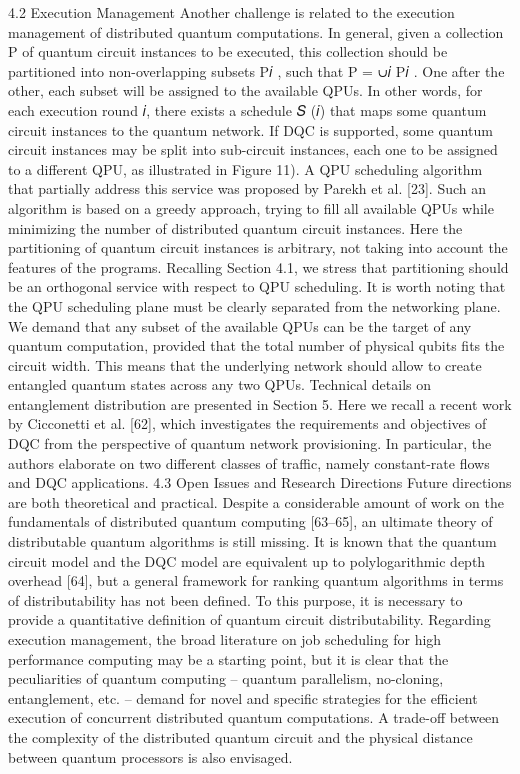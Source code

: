4.2 Execution Management Another challenge is related to the execution management of distributed quantum computations. In general, given a collection P of quantum circuit instances to be executed, this collection should be partitioned into non-overlapping subsets P𝑖 , such that P = ∪𝑖 P𝑖 . One after the other, each subset will be assigned to the available QPUs. In other words, for each execution round 𝑖, there exists a schedule 𝑆 (𝑖) that maps some quantum circuit instances to the quantum network. If DQC is supported, some quantum circuit instances may be split into sub-circuit instances, each one to be assigned to a different QPU, as illustrated in Figure 11). A QPU scheduling algorithm that partially address this service was proposed by Parekh et al. [23]. Such an algorithm is based on a greedy approach, trying to fill all available QPUs while minimizing the number of distributed quantum circuit instances. Here the partitioning of quantum circuit instances is arbitrary, not taking into account the features of the programs. Recalling Section 4.1, we stress that partitioning should be an orthogonal service with respect to QPU scheduling. It is worth noting that the QPU scheduling plane must be clearly separated from the networking plane. We demand that any subset of the available QPUs can be the target of any quantum computation, provided that the total number of physical qubits fits the circuit width. This means that the underlying network should allow to create entangled quantum states across any two QPUs. Technical details on entanglement distribution are presented in Section 5. Here we recall a recent work by Cicconetti et al. [62], which investigates the requirements and objectives of DQC from the perspective of quantum network provisioning. In particular, the authors elaborate on two different classes of traffic, namely constant-rate flows and DQC applications. 4.3 Open Issues and Research Directions Future directions are both theoretical and practical. Despite a considerable amount of work on the fundamentals of distributed quantum computing [63–65], an ultimate theory of distributable quantum algorithms is still missing. It is known that the quantum circuit model and the DQC model are equivalent up to polylogarithmic depth overhead [64], but a general framework for ranking quantum algorithms in terms of distributability has not been defined. To this purpose, it is necessary to provide a quantitative definition of quantum circuit distributability. Regarding execution management, the broad literature on job scheduling for high performance computing may be a starting point, but it is clear that the peculiarities of quantum computing – quantum parallelism, no-cloning, entanglement, etc. – demand for novel and specific strategies for the efficient execution of concurrent distributed quantum computations. A trade-off between the complexity of the distributed quantum circuit and the physical distance between quantum processors is also envisaged.

